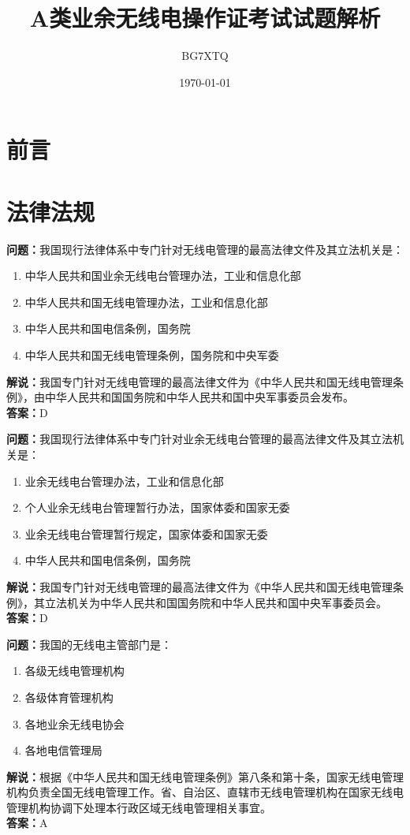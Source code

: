 \documentclass{ctexbook}%
\title{A类业余无线电操作证考试试题解析}%
\author{BG7XTQ}%
\date{\today}%
\begin{document}

\maketitle%
\tableofcontents%

\chapter*{前言}

\chapter{法律法规}

\textbf{问题：}我国现行法律体系中专门针对无线电管理的最高法律文件及其立法机关是：
\begin{enumerate}[label=\Alph*), leftmargin=3em]
\item 中华人民共和国业余无线电台管理办法，工业和信息化部
\item 中华人民共和国无线电管理办法，工业和信息化部
\item 中华人民共和国电信条例，国务院
\item 中华人民共和国无线电管理条例，国务院和中央军委
\end{enumerate}
\textbf{解说：}我国专门针对无线电管理的最高法律文件为《中华人民共和国无线电管理条例》，由中华人民共和国国务院和中华人民共和国中央军事委员会发布。\\
\textbf{答案：}D

\textbf{问题：}我国现行法律体系中专门针对业余无线电台管理的最高法律文件及其立法机关是：
\begin{enumerate}[label=\Alph*), leftmargin=3em]
\item 业余无线电台管理办法，工业和信息化部
\item 个人业余无线电台管理暂行办法，国家体委和国家无委
\item 业余无线电台管理暂行规定，国家体委和国家无委
\item 中华人民共和国电信条例，国务院
\end{enumerate}
\textbf{解说：}我国专门针对无线电管理的最高法律文件为《中华人民共和国无线电管理条例》，其立法机关为中华人民共和国国务院和中华人民共和国中央军事委员会。\\
\textbf{答案：}D

\textbf{问题：}我国的无线电主管部门是：
\begin{enumerate}[label=\Alph*), leftmargin=3em]
\item 各级无线电管理机构
\item 各级体育管理机构
\item 各地业余无线电协会
\item 各地电信管理局
\end{enumerate}
\textbf{解说：}根据《中华人民共和国无线电管理条例》第八条和第十条，国家无线电管理机构负责全国无线电管理工作。省、自治区、直辖市无线电管理机构在国家无线电管理机构协调下处理本行政区域无线电管理相关事宜。\\
\textbf{答案：}A
\end{document}

